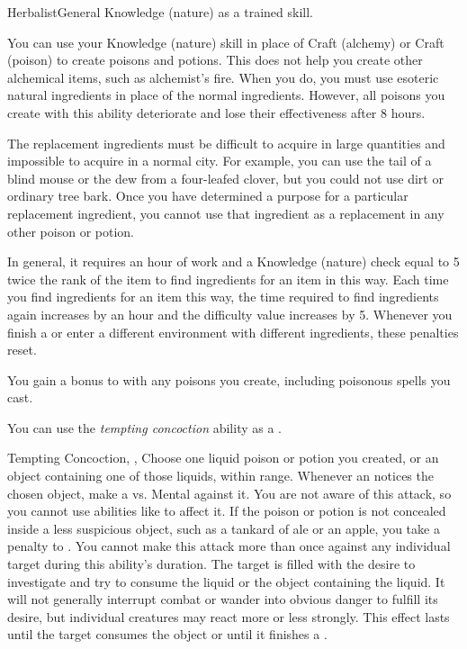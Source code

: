    \begin{feat}{Herbalist}{General}
        \featpre Knowledge (nature) as a trained skill.

         You can use your Knowledge (nature) skill in place of Craft (alchemy) or Craft (poison) to create poisons and potions.
        This does not help you create other alchemical items, such as alchemist's fire.
        When you do, you must use esoteric natural ingredients in place of the normal ingredients.
        However, all poisons you create with this ability deteriorate and lose their effectiveness after 8 hours.

        The replacement ingredients must be difficult to acquire in large quantities and impossible to acquire in a normal city.
        For example, you can use the tail of a blind mouse or the dew from a four-leafed clover, but you could not use dirt or ordinary tree bark.
        Once you have determined a purpose for a particular replacement ingredient, you cannot use that ingredient as a replacement in any other poison or potion.

        In general, it requires an hour of work and a Knowledge (nature) check equal to 5 \add twice the rank of the item to find ingredients for an item in this way.
        Each time you find ingredients for an item this way, the time required to find ingredients again increases by an hour and the difficulty value increases by 5.
        Whenever you finish a  or enter a different environment with different ingredients, these penalties reset.

         You gain a  bonus to  with any poisons you create, including poisonous spells you cast.

         You can use the \textit{tempting concoction} ability as a .
        \begin{magicalattuneability}{Tempting Concoction}{, , }
            \rankline
            Choose one liquid poison or potion you created, or an object containing one of those liquids, within \rngshort range.
            Whenever an  notices the chosen object, make a  vs. Mental against it.
            You are not aware of this attack, so you cannot use abilities like  to affect it.
            If the poison or potion is not concealed inside a less suspicious object, such as a tankard of ale or an apple, you take a  penalty to .
            You cannot make this attack more than once against any individual target during this ability's duration.
            \hit The target is filled with the desire to investigate and try to consume the liquid or the object containing the liquid.
            It will not generally interrupt combat or wander into obvious danger to fulfill its desire, but individual creatures may react more or less strongly.
            This effect lasts until the target consumes the object or until it finishes a .


\end{magicalattuneability}
\end{feat}
